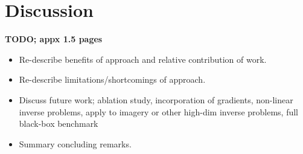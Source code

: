 \chapter{Discussion} \label{chap:discussion}



\textbf{TODO; appx 1.5 pages}

\begin{itemize}
    \item Re-describe benefits of approach and relative contribution of work.
    \item Re-describe limitations/shortcomings of approach.
    \item Discuss future work; ablation study, incorporation of gradients, non-linear inverse problems, apply to imagery or other high-dim inverse problems, full black-box benchmark
    \item Summary concluding remarks.
\end{itemize}


